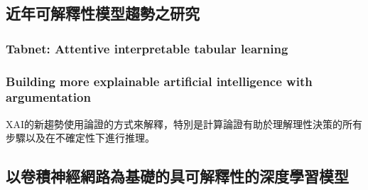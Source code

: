\documentclass[class=NCU_thesis, crop=false]{standalone}
\begin{document}
\subsection{近年可解釋性模型趨勢之研究}
\subsubsection{Tabnet: Attentive interpretable tabular learning}
\subsubsection{Building more explainable artificial intelligence with argumentation}
XAI的新趨勢使用論證的方式來解釋，特別是計算論證有助於理解理性決策的所有步驟以及在不確定性下進行推理。 \cite{LONGO2024102301}

\subsection{以卷積神經網路為基礎的具可解釋性的深度學習模型}
\end{document}
